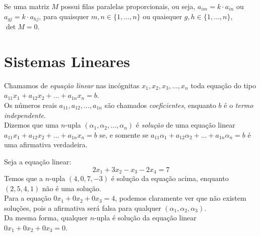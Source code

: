 \begin{prop} 
Se uma matriz $M$ possui filas paralelas proporcionais, ou seja, $a_{im}=k \cdot a_{in}$ ou $a_{gj}=k \cdot a_{hj}$, para quaisquer $m,n \in \{1,\dots,n\}$ ou quaisquer $g,h \in \{1,\dots,n\}$, $\det M = 0$.
\end{prop}

\section{Sistemas Lineares}
\begin{df}
Chamamos de \emph{equação linear }nas incógnitas $x_1,x_2,x_3,\dots,x_n$ toda equação do tipo $a_{11}x_1+a_{12}x_2+\dots+a_{1n}x_n=b$. \\ Os números reais $a_{11},a_{12},\dots,a_{1n}$ são chamados \emph{coeficientes}, enquanto $b$ é o \emph{termo independente}. \\ Dizemos que uma $n$-upla $(\alpha_1,\alpha_2,\dots,\alpha_n)$ é \emph{solução} de uma equação linear $a_{11}x_1+a_{12}x_2+\dots+a_{1n}x_n=b$ se, e somente se $a_{11}\alpha_1+a_{12}\alpha_2+\dots+a_{1n}\alpha_n=b$ é uma afirmativa verdadeira.
\end{df}
\begin{exemplo}
Seja a equação linear: \[2x_1+3x_2-x_3-2x_4=7\] 
Temos que a $n$-upla $(4,0,7,-3)$ é solução da equação acima, enquanto $(2,5,4,1)$ não é uma solução. \\
Para a equação $0x_1+0x_2+0x_3=4$, podemos claramente ver que não existem soluções, pois a afirmativa será falsa para qualquer $(\alpha_1,\alpha_2,\alpha_3)$.\\
Da mesma forma, qualquer $n$-upla é solução da equação linear $0x_1+0x_2+0x_3=0$.
\end{exemplo}
